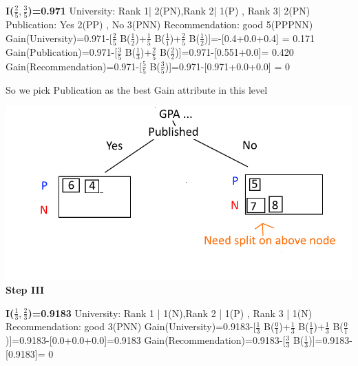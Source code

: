 \documentclass[12pt, letterpaper]{article}
\begin{document}
	\textbf{I($\frac{2}{5},\frac{3}{5}$)=0.971}\newline
	University: Rank 1| 2(PN),Rank 2| 1(P) , Rank 3| 2(PN)\newline
	Publication: Yes 2(PP) , No 3(PNN)\newline
	Recommendation: good 5(PPPNN)\newline\newline
	Gain(University)=0.971-[$\frac{2}{5}$ B($\frac{1}{2}$)+$\frac{1}{5}$ B($\frac{1}{1}$)+$\frac{2}{5}$ B($\frac{1}{2}$)]=-[0.4+0.0+0.4]
	= 0.171\newline\newline
	Gain(Publication)=0.971-[$\frac{3}{5}$ B($\frac{1}{3}$)+$\frac{2}{5}$ B($\frac{2}{2}$)]=0.971-[0.551+0.0]=
	0.420\newline\newline
	Gain(Recommendation)=0.971-[$\frac{5}{5}$ B($\frac{3}{5}$)]=0.971-[0.971+0.0+0.0]
	= 0\newline
	
	So we pick Publication as the best Gain attribute in this level
	
	\includegraphics[scale=0.8]{"problem-2-step2"}
	\textbf{Step III}
	
	\textbf{I($\frac{1}{3},\frac{2}{3}$)=0.9183}\newline	
	University: Rank 1 | 1(N),Rank 2 | 1(P) , Rank 3 | 1(N)\newline
	Recommendation: good 3(PNN)\newline
	Gain(University)=0.9183-[$\frac{1}{3}$ B($\frac{0}{1}$)+$\frac{1}{3}$ B($\frac{1}{1}$)+$\frac{1}{3}$ B($\frac{0}{1}$)]=0.9183-[0.0+0.0+0.0]=0.9183\newline\newline
	Gain(Recommendation)=0.9183-[$\frac{3}{3}$ B($\frac{1}{3}$)]=0.9183-[0.9183]= 0\newline
	
\end{document}
